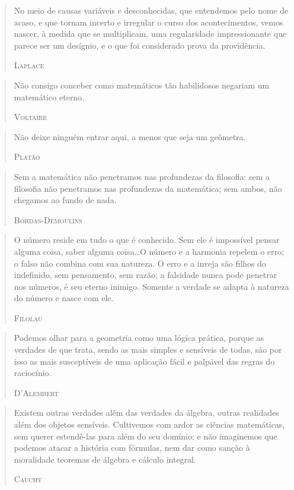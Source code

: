 \documentclass{hipatia}
\begin{document}
\begin{quote}
No meio de causas variáveis e desconhecidas, que entendemos pelo nome de acaso, e que tornam incerto e irregular o curso dos acontecimentos, vemos nascer, à medida que se multiplicam, uma regularidade impressionante que parece ser um desígnio, e o que foi considerado prova da providência.

\hfill \textsc{Laplace}
\end{quote}

\begin{quote}
Não consigo conceber como matemáticos tão habilidosos negariam um matemático eterno.

\hfill \textsc{Voltaire}
\end{quote}


\begin{quote}
Não deixe ninguém entrar aqui, a menos que seja um geômetra.

\hfill \textsc{Platão}
\end{quote}

 

\begin{quote}
Sem a matemática não penetramos nas profundezas da filosofia: sem a filosofia não penetramos nas profundezas da matemática; sem ambos, não chegamos ao fundo de nada.

\hfill \textsc{Bordas-Demoulins}
\end{quote}

 
\begin{quote}
    O número reside em tudo o que é conhecido. Sem ele é impossível pensar alguma coisa, saber alguma coisa\dots  O número e a harmonia repelem o erro; o falso não combina com sua natureza. O erro e a inveja são filhos do indefinido, sem pensamento, sem razão; a falsidade nunca pode penetrar nos números, é seu eterno inimigo. Somente a verdade se adapta à natureza do número e nasce com ele.

\hfill \textsc{Filolau}
\end{quote}


\begin{quote}
Podemos olhar para a geometria como uma lógica prática, porque as verdades de que trata, sendo as mais simples e sensíveis de todas, são por isso as mais susceptíveis de uma aplicação fácil e palpável das regras do raciocínio.

\hfill \textsc{D'Alembert}
\end{quote}

\begin{quote}
Existem outras verdades além das verdades da álgebra, outras realidades além dos objetos sensíveis. Cultivemos com ardor as ciências matemáticas, sem querer estendê-las para além do seu domínio; e não imaginemos que podemos atacar a história com fórmulas, nem dar como sanção à moralidade teoremas de álgebra e cálculo integral.

\hfill \textsc{Cauchy}
\end{quote}
\end{document}
